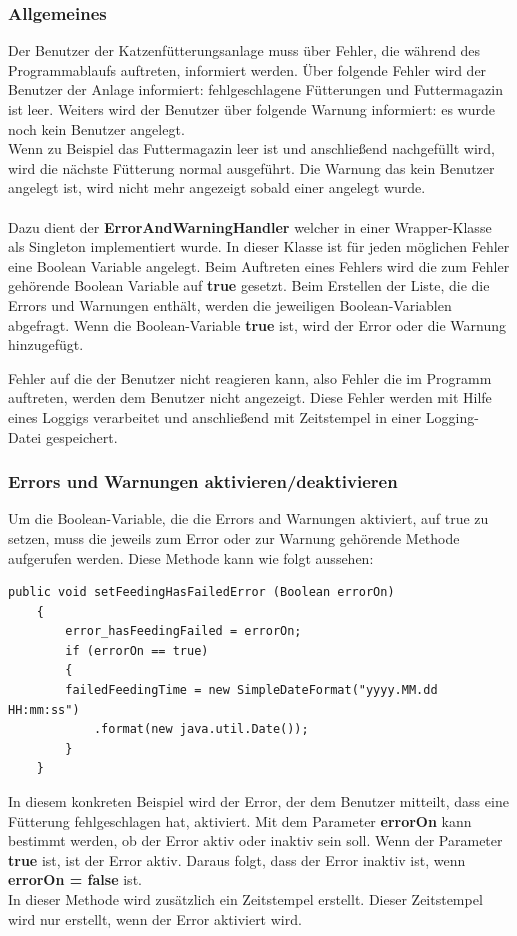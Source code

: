 \subsubsection{Allgemeines}
Der Benutzer der Katzenfütterungsanlage muss über Fehler, die während des Programmablaufs auftreten, informiert werden. Über folgende Fehler wird der Benutzer der Anlage informiert: fehlgeschlagene Fütterungen und Futtermagazin ist leer. Weiters wird der Benutzer über folgende Warnung informiert: es wurde noch kein Benutzer angelegt.
\\ Wenn zu Beispiel das Futtermagazin leer ist und anschließend nachgefüllt wird, wird die nächste Fütterung normal ausgeführt. Die Warnung das kein Benutzer angelegt ist, wird nicht mehr angezeigt sobald einer angelegt wurde.
\\ \\ Dazu dient der \textbf{ErrorAndWarningHandler} welcher in einer Wrapper-Klasse als Singleton implementiert wurde. In dieser Klasse ist für jeden möglichen Fehler eine Boolean Variable angelegt. Beim Auftreten eines Fehlers wird die zum Fehler gehörende Boolean Variable auf \textbf{true} gesetzt. Beim Erstellen der Liste, die die Errors und Warnungen enthält, werden die jeweiligen Boolean-Variablen abgefragt. Wenn die Boolean-Variable \textbf{true} ist, wird der Error oder die Warnung hinzugefügt. 

\vspace{10pt}

Fehler auf die der Benutzer nicht reagieren kann, also Fehler die im Programm auftreten, werden dem Benutzer nicht angezeigt. Diese Fehler werden mit Hilfe eines Loggigs verarbeitet und anschließend mit Zeitstempel in einer Logging-Datei gespeichert. 

\subsubsection{Errors und Warnungen aktivieren/deaktivieren}
Um die Boolean-Variable, die die Errors and Warnungen aktiviert, auf true zu setzen, muss die jeweils zum Error oder zur Warnung gehörende Methode aufgerufen werden. Diese Methode kann wie folgt aussehen:
\begin{lstlisting}[style=JavaStyle, caption=Error setzen]
	public void setFeedingHasFailedError (Boolean errorOn)
	{
		error_hasFeedingFailed = errorOn;
		if (errorOn == true)
		{
		failedFeedingTime = new SimpleDateFormat("yyyy.MM.dd HH:mm:ss")
			.format(new java.util.Date());
		}   
	}
\end{lstlisting}
In diesem konkreten Beispiel wird der Error, der dem Benutzer mitteilt, dass eine Fütterung fehlgeschlagen hat, aktiviert. Mit dem Parameter \textbf{errorOn} kann bestimmt werden, ob der Error aktiv oder inaktiv sein soll. Wenn der Parameter \textbf{true} ist, ist der Error aktiv. Daraus folgt, dass der Error inaktiv ist, wenn \textbf{errorOn = false} ist. 
\\ In dieser Methode wird zusätzlich ein Zeitstempel erstellt. Dieser Zeitstempel wird nur erstellt, wenn der Error aktiviert wird. 

